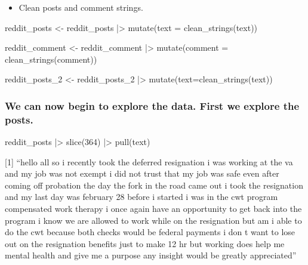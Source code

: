\documentclass[
  letterpaper,
  DIV=11,
  numbers=noendperiod]{scrartcl}
\newenvironment{Shaded}{\begin{snugshade}}{\end{snugshade}}
\newcommand{\AttributeTok}[1]{\textcolor[rgb]{0.40,0.45,0.13}{#1}}
\newcommand{\DecValTok}[1]{\textcolor[rgb]{0.68,0.00,0.00}{#1}}
\newcommand{\FunctionTok}[1]{\textcolor[rgb]{0.28,0.35,0.67}{#1}}
\newcommand{\NormalTok}[1]{\textcolor[rgb]{0.00,0.23,0.31}{#1}}
\newcommand{\OtherTok}[1]{\textcolor[rgb]{0.00,0.23,0.31}{#1}}
\newcommand{\SpecialCharTok}[1]{\textcolor[rgb]{0.37,0.37,0.37}{#1}}
\providecommand{\tightlist}{%
  \setlength{\itemsep}{0pt}\setlength{\parskip}{0pt}}\usepackage{longtable,booktabs,array}
\begin{document}
\begin{itemize}
\tightlist
\item
  Clean posts and comment strings.
\end{itemize}

\begin{Shaded}
\begin{Highlighting}[]
\NormalTok{reddit\_posts }\OtherTok{\textless{}{-}}\NormalTok{ reddit\_posts }\SpecialCharTok{|\textgreater{}} 
  \FunctionTok{mutate}\NormalTok{(}\AttributeTok{text =} \FunctionTok{clean\_strings}\NormalTok{(text))}

\NormalTok{reddit\_comment }\OtherTok{\textless{}{-}}\NormalTok{ reddit\_comment }\SpecialCharTok{|\textgreater{}} 
  \FunctionTok{mutate}\NormalTok{(}\AttributeTok{comment =} \FunctionTok{clean\_strings}\NormalTok{(comment))}

\NormalTok{reddit\_posts\_2 }\OtherTok{\textless{}{-}}\NormalTok{ reddit\_posts\_2 }\SpecialCharTok{|\textgreater{}} 
  \FunctionTok{mutate}\NormalTok{(}\AttributeTok{text=}\FunctionTok{clean\_strings}\NormalTok{(text))}
\end{Highlighting}
\end{Shaded}

\hfill\break

\subsubsection{We can now begin to explore the data. First we explore
the
posts.}\label{we-can-now-begin-to-explore-the-data.-first-we-explore-the-posts.}

\begin{Shaded}
\begin{Highlighting}[]
\NormalTok{  reddit\_posts }\SpecialCharTok{|\textgreater{}}
  \FunctionTok{slice}\NormalTok{(}\DecValTok{364}\NormalTok{) }\SpecialCharTok{|\textgreater{}} 
  \FunctionTok{pull}\NormalTok{(text) }
\end{Highlighting}
\end{Shaded}

{[}1{]} ``hello all so i recently took the deferred resignation i was
working at the va and my job was not exempt i did not trust that my job
was safe even after coming off probation the day the fork in the road
came out i took the resignation and my last day was february 28 before i
started i was in the cwt program compensated work therapy i once again
have an opportunity to get back into the program i know we are allowed
to work while on the resignation but am i able to do the cwt because
both checks would be federal payments i don t want to lose out on the
resignation benefits just to make 12 hr but working does help me mental
health and give me a purpose any insight would be greatly appreciated''
\end{document}
